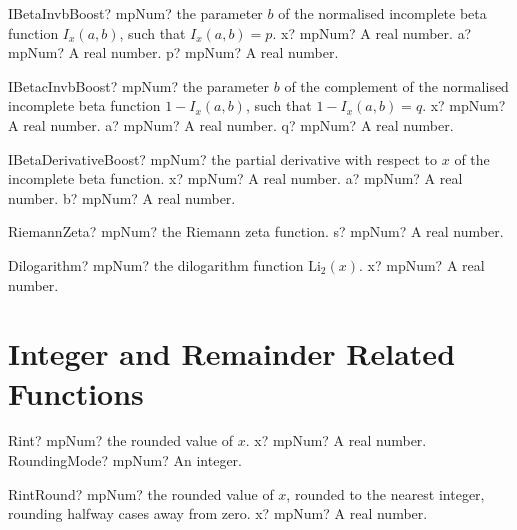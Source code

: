 \documentclass[12pt,a4paper,openany]{book}
\begin{document}
\begin{mpFunctionsExtract}
\mpFunctionThree
{IBetaInvbBoost? mpNum? the parameter $b$ of the normalised incomplete beta function $I_x(a,b)$, such that $I_x(a,b) = p$.}
{x? mpNum? A real number.}
{a? mpNum? A real number.}
{p? mpNum? A real number.}
\end{mpFunctionsExtract}

\begin{mpFunctionsExtract}
\mpFunctionThree
{IBetacInvbBoost? mpNum? the parameter $b$ of the complement of the normalised incomplete beta function $1-I_x(a,b)$, such that $1-I_x(a,b) = q$.}
{x? mpNum? A real number.}
{a? mpNum? A real number.}
{q? mpNum? A real number.}
\end{mpFunctionsExtract}

\begin{mpFunctionsExtract}
\mpFunctionThree
{IBetaDerivativeBoost? mpNum? the partial derivative with respect to $x$ of the incomplete beta function.}
{x? mpNum? A real number.}
{a? mpNum? A real number.}
{b? mpNum? A real number.}
\end{mpFunctionsExtract}

\begin{mpFunctionsExtract}
\mpFunctionOne
{RiemannZeta? mpNum? the Riemann zeta function.}
{s? mpNum? A real number.}
\end{mpFunctionsExtract}

\begin{mpFunctionsExtract}
\mpFunctionOne
{Dilogarithm? mpNum? the dilogarithm function $\text{Li}_2(x)$.}
{x? mpNum? A real number.}
\end{mpFunctionsExtract}

\section{Integer and Remainder Related Functions}

\begin{mpFunctionsExtract}
\mpFunctionOne
{Rint? mpNum? the rounded value of $x$.}
{x? mpNum? A real number.}
{RoundingMode? mpNum? An integer.}
\end{mpFunctionsExtract}

\begin{mpFunctionsExtract}
\mpFunctionOne
{RintRound? mpNum? the rounded value of $x$, rounded to the nearest integer, rounding halfway cases away from zero.}
{x? mpNum? A real number.}
\end{mpFunctionsExtract}
\end{document}
